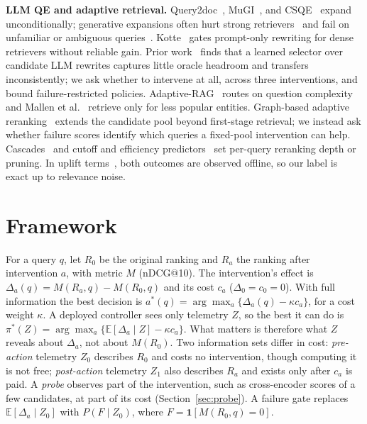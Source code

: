 \documentclass[sigconf,anonymous,review]{acmart}
\begin{document}
\textbf{LLM QE and adaptive retrieval.} Query2doc~\cite{query2doc},
MuGI~\cite{mugi}, and CSQE~\cite{csqe} expand unconditionally;
generative expansions often hurt strong retrievers~\cite{weller-qe-fails}
and fail on unfamiliar or ambiguous queries~\cite{qe-fails-unfamiliar}.
Kotte~\cite{not-all-queries-need-rewriting} gates prompt-only rewriting
for dense retrievers without reliable gain. Prior work~\cite{prior-anon}
finds that a learned selector over candidate LLM rewrites captures little
oracle headroom and transfers inconsistently; we ask whether to intervene
at all, across three interventions, and bound failure-restricted policies.
Adaptive-RAG~\cite{adaptive-rag} routes on question complexity and
Mallen et al.~\cite{mallen-adaptive} retrieve only for less popular
entities. Graph-based adaptive reranking~\cite{gar} extends the
candidate pool beyond first-stage retrieval; we instead ask whether
failure scores identify which queries a fixed-pool intervention can
help. Cascades~\cite{cascade-ranking} and cutoff and efficiency
predictors~\cite{culpepper-cutoff,tonellotto-selective} set per-query
reranking depth or pruning. In uplift terms~\cite{causal-classification}, both
outcomes are observed offline, so our label is exact up to relevance
noise.

\section{Framework}
\label{sec:framework}

For a query $q$, let $R_0$ be the original ranking and $R_a$ the
ranking after intervention $a$, with metric $M$ (nDCG@10). The
intervention's effect is $\Delta_a(q)=M(R_a,q)-M(R_0,q)$ and its cost
$c_a$ ($\Delta_0=c_0=0$). With full information the best decision is
$a^*(q)=\arg\max_a\{\Delta_a(q)-\kappa c_a\}$, for a cost weight
$\kappa$. A deployed controller sees only telemetry $Z$, so the best
it can do is $\pi^*(Z)=\arg\max_a\{\mathbb{E}[\Delta_a\mid Z]-\kappa c_a\}$.
What matters is therefore what $Z$ reveals about $\Delta_a$, not about
$M(R_0)$. Two information sets differ in cost: \emph{pre-action}
telemetry $Z_0$ describes $R_0$ and costs no intervention, though
computing it is not free; \emph{post-action}
telemetry $Z_1$ also describes $R_a$ and exists only after $c_a$ is
paid. A \emph{probe} observes part of the intervention, such as
cross-encoder scores of a few candidates, at part of its cost
(Section~\ref{sec:probe}). A failure gate replaces $\mathbb{E}[\Delta_a\mid Z_0]$ with
$P(F\mid Z_0)$, where $F=\mathbf{1}[M(R_0,q)=0]$.
\end{document}
